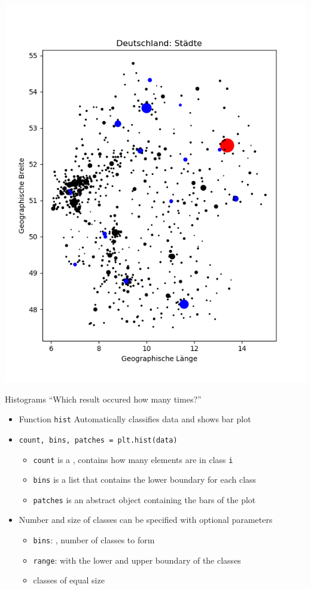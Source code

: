 \begin{frame}
%
\begin{tcolorbox}[title=Next Goal: Stacked Plots]
\begin{center}
	\includegraphics[width=.4\linewidth]{./gfx/plt-de}
\end{center}
\end{tcolorbox}
%
\end{frame}


\begin{frame}{Histograms}
%
\enquote{Which result occured how many times?}
\begin{itemize}
\item Function \texttt{hist} Automatically classifies data and shows bar plot
\item \texttt{count, bins, patches = plt.hist(data)}
	\begin{itemize}
	\item \texttt{count} is a , contains how many elements are in class \texttt{i}
	\item \texttt{bins} is a list that contains the lower boundary for each class
	\item \texttt{patches} is an abstract object containing the bars of the plot
	\end{itemize}
\item Number and size of classes can be specified with optional parameters
	\begin{itemize}
	\item \texttt{bins}: , number of classes to form
	\item \texttt{range}:  with the lower and upper boundary of the classes
	\item[\Thus] classes of equal size
	\end{itemize}
\end{itemize}
%
\end{frame}

